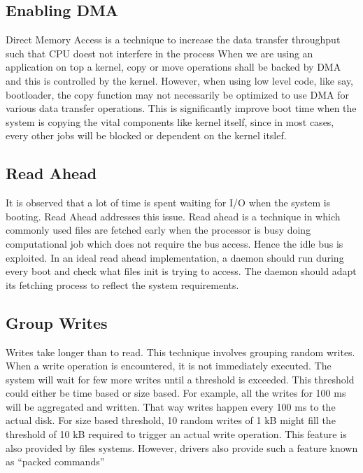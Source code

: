 \subsection{Enabling DMA}

Direct Memory Access is a technique to increase the data
transfer throughput such that CPU doest not interfere in the process
When we are using an application on top a kernel, copy or move operations
shall be backed by DMA and this is controlled by the kernel. 
However, when using low level code, like say, bootloader, the copy function
may not necessarily be optimized to use DMA for various data transfer
operations. This is significantly improve boot time when the system
is copying the vital components like kernel itself, since in most
cases, every other jobs will be blocked or dependent on the kernel
itslef.

\subsection{Read Ahead}

It is observed that a lot of time is spent waiting for I/O
when the system is booting. Read Ahead addresses this issue.
Read ahead is a technique in which commonly used files are
fetched early when the processor is busy doing computational job
which does not require the bus access. Hence the idle bus is
exploited. In an ideal read ahead implementation, a daemon should
run during every boot and check what files init is trying to access.
The daemon should adapt its fetching process to reflect the
system requirements.

\subsection{Group Writes}

Writes take longer than to read. This technique involves
grouping random writes. When a write operation is encountered,
it is not immediately executed. The system will wait for few more
writes until a threshold is exceeded. This threshold could either
be time based or size based. For example, all the writes for 100 ms
will be aggregated and written. That way writes happen every 100 ms
to the actual disk. For size based threshold, 10 random writes of 1 kB
might fill the threshold of 10 kB required to trigger an actual write
operation. This feature is also provided by files systems. However,
drivers also provide such a feature known as ``packed commands''

